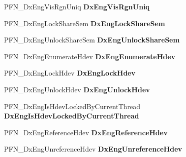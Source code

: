 \begin{DoxyCompactItemize}
P\+F\+N\+\_\+\+Dx\+Eng\+Vis\+Rgn\+Uniq {\bfseries Dx\+Eng\+Vis\+Rgn\+Uniq}
\item 
\mbox{\label{struct___d_x_e_n_g___f_u_n_c_t_i_o_n_s_ad55950121e4150f0477cc52f4382ff13}} 
P\+F\+N\+\_\+\+Dx\+Eng\+Lock\+Share\+Sem {\bfseries Dx\+Eng\+Lock\+Share\+Sem}
\item 
\mbox{\label{struct___d_x_e_n_g___f_u_n_c_t_i_o_n_s_a3427a5e968aa812b5347985306b8a3ca}} 
P\+F\+N\+\_\+\+Dx\+Eng\+Unlock\+Share\+Sem {\bfseries Dx\+Eng\+Unlock\+Share\+Sem}
\item 
\mbox{\label{struct___d_x_e_n_g___f_u_n_c_t_i_o_n_s_a719a128eec48d5eb152419ae5d8131bb}} 
P\+F\+N\+\_\+\+Dx\+Eng\+Enumerate\+Hdev {\bfseries Dx\+Eng\+Enumerate\+Hdev}
\item 
\mbox{\label{struct___d_x_e_n_g___f_u_n_c_t_i_o_n_s_aeb8d029901301eb5321fa7a365ab8247}} 
P\+F\+N\+\_\+\+Dx\+Eng\+Lock\+Hdev {\bfseries Dx\+Eng\+Lock\+Hdev}
\item 
\mbox{\label{struct___d_x_e_n_g___f_u_n_c_t_i_o_n_s_a5839fc3852e1bb770992f58447649f48}} 
P\+F\+N\+\_\+\+Dx\+Eng\+Unlock\+Hdev {\bfseries Dx\+Eng\+Unlock\+Hdev}
\item 
\mbox{\label{struct___d_x_e_n_g___f_u_n_c_t_i_o_n_s_a629ebfbf56b4b9ad7269c16afac6794b}} 
P\+F\+N\+\_\+\+Dx\+Eng\+Is\+Hdev\+Locked\+By\+Current\+Thread {\bfseries Dx\+Eng\+Is\+Hdev\+Locked\+By\+Current\+Thread}
\item 
\mbox{\label{struct___d_x_e_n_g___f_u_n_c_t_i_o_n_s_aceeb8f1cfaac817868f4c30513ce5e26}} 
P\+F\+N\+\_\+\+Dx\+Eng\+Reference\+Hdev {\bfseries Dx\+Eng\+Reference\+Hdev}
\item 
\mbox{\label{struct___d_x_e_n_g___f_u_n_c_t_i_o_n_s_a40a2974b857fcaf8f213bdce075ea40b}} 
P\+F\+N\+\_\+\+Dx\+Eng\+Unreference\+Hdev {\bfseries Dx\+Eng\+Unreference\+Hdev}
\item 
\mbox{\label{struct___d_x_e_n_g___f_u_n_c_t_i_o_n_s_a76a78d9deb91ed6466d738a3d617f38e}} 

\end{DoxyCompactItemize}
